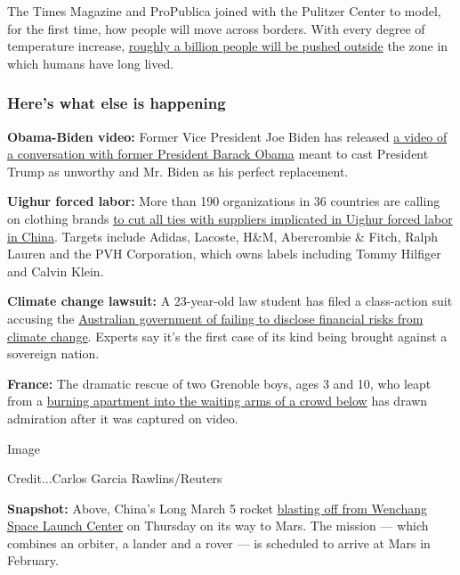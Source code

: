 The Times Magazine and ProPublica joined with the Pulitzer Center to
model, for the first time, how people will move across borders. With
every degree of temperature increase,
\href{https://www.nytimes.com/interactive/2020/07/23/magazine/climate-migration.html}{roughly
a billion people will be pushed outside} the zone in which humans have
long lived.

\hypertarget{heres-what-else-is-happening}{%
\subsubsection{Here's what else is
happening}\label{heres-what-else-is-happening}}

\textbf{Obama-Biden video:} Former Vice President Joe Biden has released
\href{https://www.nytimes.com/2020/07/23/us/politics/barack-obama-joe-biden-video.html}{a
video of a conversation with former President Barack Obama} meant to
cast President Trump as unworthy and Mr. Biden as his perfect
replacement.

\textbf{Uighur forced labor:} More than 190 organizations in 36
countries are calling on clothing brands
\href{https://www.nytimes.com/2020/07/23/fashion/uighur-forced-labor-cotton-fashion.html}{to
cut all ties with suppliers implicated in Uighur forced labor in China}.
Targets include Adidas, Lacoste, H\&M, Abercrombie \& Fitch, Ralph
Lauren and the PVH Corporation, which owns labels including Tommy
Hilfiger and Calvin Klein.

\textbf{Climate change lawsuit:} A 23-year-old law student has filed a
class-action suit accusing the
\href{https://www.nytimes.com/2020/07/23/world/australia/lawsuit-climate-change-bonds.html}{Australian
government of failing to disclose financial risks from climate change}.
Experts say it's the first case of its kind being brought against a
sovereign nation.

\textbf{France:} The dramatic rescue of two Grenoble boys, ages 3 and
10, who leapt from a
\href{https://www.nytimes.com/2020/07/23/world/europe/france-children-rescue-video.html}{burning
apartment into the waiting arms of a crowd below} has drawn admiration
after it was captured on video.

Image

Credit...Carlos Garcia Rawlins/Reuters

\textbf{Snapshot:} Above, China's Long March 5 rocket
\href{https://www.nytimes.com/2020/07/22/science/mars-china-launch.html}{blasting
off from Wenchang Space Launch Center} on Thursday on its way to Mars.
The mission --- which combines an orbiter, a lander and a rover --- is
scheduled to arrive at Mars in February.

